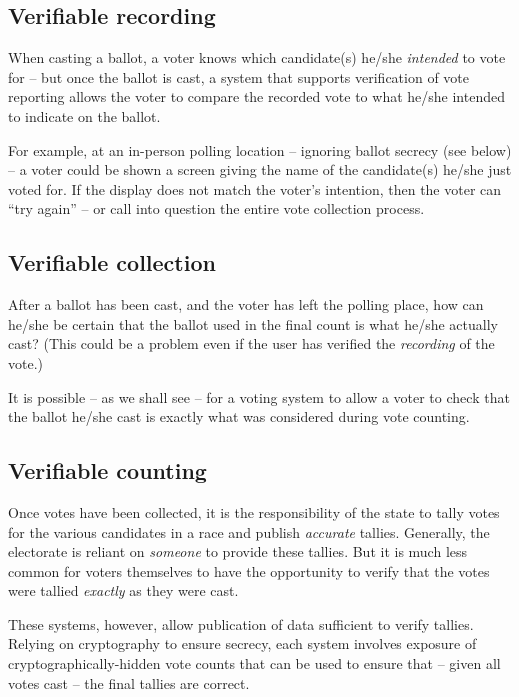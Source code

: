 \documentclass[10pt]{article}
\begin{document}
\begin{multicols}{2}
\subsection{Verifiable recording}

When casting a ballot, a voter knows which candidate(s) he/she \emph{intended} to vote for -- but
once the ballot is cast, a system that supports verification of vote reporting allows the voter to
compare the recorded vote to what he/she intended to indicate on the ballot.

For example, at an in-person polling location -- ignoring ballot secrecy (see below) -- a voter
could be shown a screen giving the name of the candidate(s) he/she just voted for. If the display
does not match the voter's intention, then the voter can ``try again'' -- or call into question the
entire vote collection process.

\subsection{Verifiable collection}

After a ballot has been cast, and the voter has left the polling place, how can he/she be certain
that the ballot used in the final count is what he/she actually cast? (This could be a problem even
if the user has verified the \emph{recording} of the vote.)

It is possible -- as we shall see -- for a voting system to allow a voter to check that the ballot
he/she cast is exactly what was considered during vote counting.

\subsection{Verifiable counting}

Once votes have been collected, it is the responsibility of the state to tally votes for the various
candidates in a race and publish \emph{accurate} tallies. Generally, the electorate is reliant on
\emph{someone} to provide these tallies. But it is much less common for voters themselves to have
the opportunity to verify that the votes were tallied \emph{exactly} as they were cast.

These systems, however, allow publication of data sufficient to verify tallies. Relying on
cryptography to ensure secrecy, each system involves exposure of cryptographically-hidden vote
counts that can be used to ensure that -- given all votes cast -- the final tallies are correct.


\end{multicols}
\end{document}
